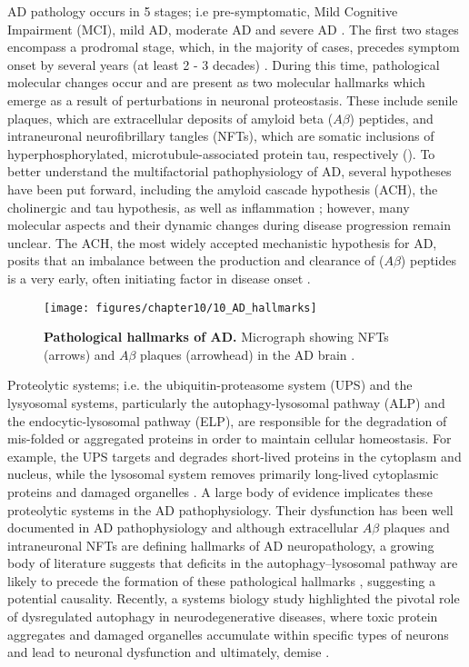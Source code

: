 AD pathology occurs in 5 stages; i.e pre-symptomatic, Mild Cognitive Impairment (MCI), mild AD, moderate AD and severe AD \citep{Caldwell2015}. The first two stages encompass a prodromal stage, which, in the majority of cases, precedes symptom onset by several years (at least 2 - 3 decades) \citep{Caldwell2015,Caselli2013,Penn1993}. During this time, pathological molecular changes occur and are present as two molecular hallmarks which emerge as a result of perturbations in neuronal proteostasis. These include senile plaques, which are extracellular deposits of amyloid beta ($A\beta$)
peptides, and intraneuronal neurofibrillary tangles (NFTs), which are somatic inclusions of hyperphosphorylated, microtubule-associated protein tau, respectively \citep{Mattson2008} (). To better understand the multifactorial pathophysiology of AD, several hypotheses have been put forward, including the amyloid cascade hypothesis (ACH), the cholinergic and tau hypothesis, as well as inflammation \citep{Kurz2011}; however, many molecular aspects and their dynamic changes during disease progression remain unclear. The ACH, the most widely accepted mechanistic hypothesis for AD, posits that an imbalance between the production and clearance of ($A\beta$) peptides is a very early, often initiating factor in disease onset \citep{Hardy2009,Hardy1992}.

\begin{figure}[!htbp]
  \texttt{[image: figures/chapter10/10\_AD\_hallmarks]}
  \caption[Pathological hallmarks of AD]{\textbf{Pathological hallmarks of AD.} Micrograph showing NFTs (arrows) and $A\beta$ plaques (arrowhead) in the AD brain \citep{Nixon2007}.}
  \label{fig:10_AD_hallmarks}
\end{figure}

Proteolytic systems; i.e. the ubiquitin-proteasome system (UPS) and the lysyosomal systems, particularly the autophagy-lysosomal pathway (ALP) and the endocytic-lysosomal pathway (ELP), are responsible for the degradation of mis-folded or aggregated proteins in order to maintain cellular homeostasis. For example, the UPS targets and degrades short-lived proteins in the cytoplasm and nucleus, while the lysosomal system removes primarily long-lived cytoplasmic proteins and damaged organelles \citep{Ravikumar2003,Rubinsztein2005}. A large body of evidence implicates these proteolytic systems in the AD pathophysiology. Their dysfunction has been well documented in AD pathophysiology and although extracellular $A\beta$ plaques and intraneuronal NFTs are defining hallmarks of AD neuropathology, a growing body of literature suggests that deficits in the autophagy–lysosomal pathway are likely to precede the formation of these pathological hallmarks \citep{Cataldo2000,Nixon2011,Perez2015,zare-shahabadi2015}, suggesting a potential causality. Recently, a systems biology study highlighted the pivotal role of dysregulated autophagy in neurodegenerative diseases, where toxic protein aggregates and damaged organelles accumulate within specific types of neurons and lead to neuronal dysfunction and ultimately, demise \citep{Caberlotto2014}.

